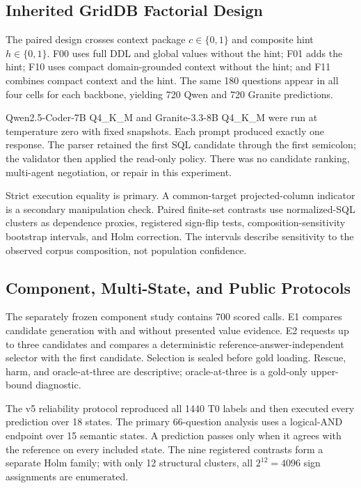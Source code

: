 \documentclass[applsci,article,submit,moreauthors]{Definitions/mdpi}
\begin{document}
\subsection{Inherited GridDB Factorial Design}

The paired design crosses context package $c\in\{0,1\}$ and composite hint $h\in\{0,1\}$. F00 uses full DDL and global values without the hint; F01 adds the hint; F10 uses compact domain-grounded context without the hint; and F11 combines compact context and the hint. The same 180 questions appear in all four cells for each backbone, yielding 720 Qwen and 720 Granite predictions.

Qwen2.5-Coder-7B Q4\_K\_M and Granite-3.3-8B Q4\_K\_M were run at temperature zero with fixed snapshots. Each prompt produced exactly one response. The parser retained the first SQL candidate through the first semicolon; the validator then applied the read-only policy. There was no candidate ranking, multi-agent negotiation, or repair in this experiment.

Strict execution equality is primary. A common-target projected-column indicator is a secondary manipulation check. Paired finite-set contrasts use normalized-SQL clusters as dependence proxies, registered sign-flip tests, composition-sensitivity bootstrap intervals, and Holm correction. The intervals describe sensitivity to the observed corpus composition, not population confidence.

\subsection{Component, Multi-State, and Public Protocols}

The separately frozen component study contains 700 scored calls. E1 compares candidate generation with and without presented value evidence. E2 requests up to three candidates and compares a deterministic reference-answer-independent selector with the first candidate. Selection is sealed before gold loading. Rescue, harm, and oracle-at-three are descriptive; oracle-at-three is a gold-only upper-bound diagnostic.

The v5 reliability protocol reproduced all 1440 T0 labels and then executed every prediction over 18 states. The primary 66-question analysis uses a logical-AND endpoint over 15 semantic states. A prediction passes only when it agrees with the reference on every included state. The nine registered contrasts form a separate Holm family; with only 12 structural clusters, all $2^{12}=4096$ sign assignments are enumerated.
\end{document}
